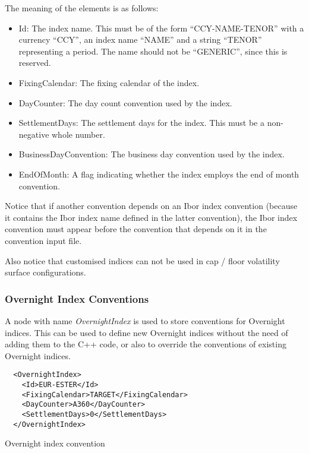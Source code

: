 The meaning of the elements is as follows:

\begin{itemize}
\item Id: The index name. This must be of the form ``CCY-NAME-TENOR'' with a currency ``CCY'', an index name ``NAME''
  and a string ``TENOR'' representing a period. The name should not be ``GENERIC'', since this is reserved.
\item FixingCalendar: The fixing calendar of the index.
\item DayCounter: The day count convention used by the index.
\item SettlementDays: The settlement days for the index. This must be a non-negative whole number.
\item BusinessDayConvention: The business day convention used by the index.
\item EndOfMonth: A flag indicating whether the index employs the end of month convention.
\end{itemize}

Notice that if another convention depends on an Ibor index convention (because it contains the Ibor index name defined
in the latter convention), the Ibor index convention must appear before the convention that depends on it in the
convention input file.

Also notice that customised indices can not be used in cap / floor volatility surface configurations.

\subsubsection{Overnight Index Conventions}

A node with name \emph{OvernightIndex} is used to store conventions for Overnight indices. This can be used to define
new Overnight indices without the need of adding them to the C++ code, or also to override the conventions of existing
Overnight indices.

\begin{listing}[H]
\begin{verbatim}
  <OvernightIndex>
    <Id>EUR-ESTER</Id>
    <FixingCalendar>TARGET</FixingCalendar>
    <DayCounter>A360</DayCounter>
    <SettlementDays>0</SettlementDays>
  </OvernightIndex>
\end{verbatim}
\caption{Overnight index convention}
\label{lst:overnight_index_conventions}
\end{listing}

